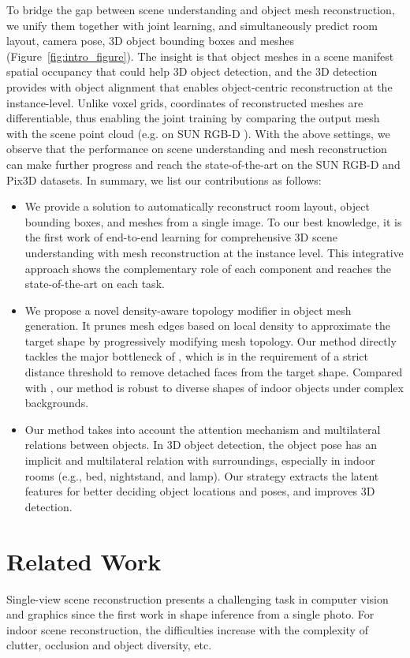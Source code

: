 \documentclass[10pt,twocolumn,letterpaper]{article}
\begin{document}
To bridge the gap between scene understanding and object mesh reconstruction, we unify them together with joint learning, and simultaneously predict room layout, camera pose, 3D object bounding boxes and meshes (Figure~\ref{fig:intro_figure}). The insight is that object meshes in a scene manifest spatial occupancy that could help 3D object detection, and the 3D detection provides with object alignment that enables object-centric reconstruction at the instance-level. Unlike voxel grids, coordinates of reconstructed meshes are differentiable, thus enabling the joint training by comparing the output mesh with the scene point cloud (e.g. on SUN RGB-D \cite{song2015sun}). With the above settings, we observe that the performance on scene understanding and mesh reconstruction can make further progress and reach the state-of-the-art on the SUN RGB-D \cite{song2015sun} and Pix3D \cite{sun2018pix3d} datasets. In summary, we list our contributions as follows:
\begin{itemize}
	\item We provide a solution to automatically reconstruct room layout, object bounding boxes, and meshes from a single image. To our best knowledge, it is the first work of end-to-end learning for comprehensive 3D scene understanding with mesh reconstruction at the instance level. This integrative approach shows the complementary role of each component and reaches the state-of-the-art on each task.
	\item We propose a novel density-aware topology modifier in object mesh generation. It prunes mesh edges based on local density to approximate the target shape by progressively modifying mesh topology. Our method directly tackles the major bottleneck of \cite{Junyi}, which is in the requirement of a strict distance threshold to remove detached faces from the target shape. Compared with \cite{Junyi}, our method is robust to diverse shapes of indoor objects under complex backgrounds.
	\item Our method takes into account the attention mechanism and multilateral relations between objects. In 3D object detection, the object pose has an implicit and multilateral relation with surroundings, especially in indoor rooms (e.g., bed, nightstand, and lamp). Our strategy extracts the latent features for better deciding object locations and poses, and improves 3D detection.
\end{itemize}

\section{Related Work}
Single-view scene reconstruction presents a challenging task in computer vision and graphics since the first work \cite{roberts1963machine} in shape inference from a single photo. For indoor scene reconstruction, the difficulties increase with the complexity of clutter, occlusion and object diversity, etc. 
\end{document}
